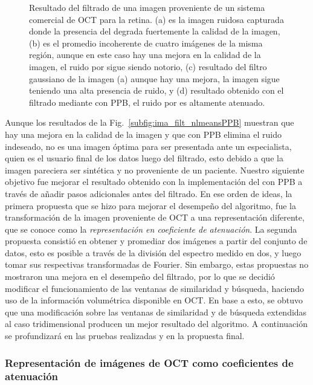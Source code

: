 \begin{figure}[ht!]
	\caption[Resultado del filtrado de una imagen proveniente de un sistema comercial de OCT para la retina]{Resultado del filtrado de una imagen proveniente de un sistema comercial de OCT para la retina. (a) es la imagen ruidosa capturada donde la presencia del \speckle degrada fuertemente la calidad de la imagen, (b) es el promedio incoherente de cuatro imágenes de la misma región, aunque en este caso hay una mejora en la calidad de la imagen, el ruido por \speckle sigue siendo notorio, (c) resultado del filtro gaussiano de la imagen (a) aunque hay una mejora, la imagen sigue teniendo una alta presencia de ruido, y (d) resultado obtenido con el filtrado mediante \nlmeans con PPB, el ruido por \speckle es altamente atenuado.}
	\label{fig:ima_filt_nlmeansPPB}
\end{figure}

Aunque los resultados de la Fig.~\ref{subfig:ima_filt_nlmeansPPB} muestran que hay una mejora en la calidad de la imagen y que \nlmeans con PPB elimina el ruido indeseado, no es una imagen óptima para ser presentada ante un especialista, quien es el usuario final de los datos luego del filtrado, esto debido a que la imagen pareciera ser sintética y no proveniente de un paciente. Nuestro siguiente objetivo fue mejorar el resultado obtenido con la implementación del \nlmeans con PPB a través de añadir pasos adicionales antes del filtrado. En ese orden de ideas, la primera propuesta que se hizo para mejorar el desempeño del algoritmo, fue la transformación de la imagen proveniente de OCT a una representación diferente, que se conoce como la \textit{representación en coeficiente de atenuación}. La segunda propuesta consistió en obtener y promediar dos imágenes a partir del conjunto de datos, esto es posible a través de la división del espectro medido en dos, y luego tomar sus respectivas transformadas de Fourier. Sin embargo, estas propuestas no mostraron una mejora en el desempeño del filtrado, por lo que se decidió modificar el funcionamiento de las ventanas de similaridad y búsqueda, haciendo uso de la información volumétrica disponible en OCT. En base a esto, se obtuvo que una modificación sobre las ventanas de similaridad y de búsqueda extendidas al caso tridimensional producen un mejor resultado del algoritmo. A continuación se profundizará en las pruebas realizadas y en la propuesta final.

\subsubsection{Representación de imágenes de OCT como coeficientes de atenuación}

